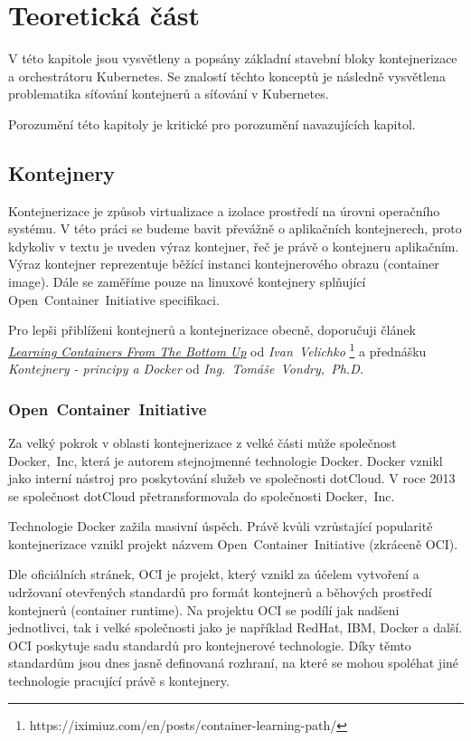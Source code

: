 \chapter{Teoretická část}
\begin{chapterabstract}
V této kapitole jsou vysvětleny a popsány základní stavební bloky kontejnerizace a orchestrátoru Kubernetes. Se znalostí těchto konceptů je následně vysvětlena problematika síťování kontejnerů a síťování v Kubernetes.  

Porozumění této kapitoly je kritické pro porozumění navazujících kapitol.
\end{chapterabstract}

\section{Kontejnery}
Kontejnerizace je způsob virtualizace a izolace prostředí na úrovni operačního systému. V této práci se budeme bavit převážně o aplikačních kontejnerech, proto kdykoliv v textu je uveden výraz kontejner, řeč je právě o kontejneru aplikačním. Výraz kontejner reprezentuje běžící instanci kontejnerového obrazu (container image). Dále se zaměříme pouze na linuxové kontejnery splňující Open~Container~Initiative specifikaci.

Pro lepši přiblíženi kontejnerů a kontejnerizace obecně, doporučuji článek \href{https://iximiuz.com/en/posts/container-learning-path/}{\textit{Learning Containers From The Bottom Up}}  od \textit{Ivan~Velichko} \footnote{https://iximiuz.com/en/posts/container-learning-path/} a přednášku \textit{Kontejnery - principy a Docker} od \textit{Ing.~Tomáše~Vondry,~Ph.D.}
\subsection{Open~Container~Initiative}
Za velký pokrok v oblasti kontejnerizace z velké části může společnost Docker,~Inc, která je autorem stejnojmenné technologie Docker. Docker vznikl jako interní nástroj pro poskytování služeb ve společnosti dotCloud. V roce 2013 se společnost dotCloud přetransformovala do společnosti Docker,~Inc. \cite{poulton_2020_docker}

Technologie Docker zažila masivní úspěch. Právě kvůli vzrůstající popularitě kontejnerizace vznikl projekt názvem Open~Container~Initiative (zkráceně OCI).

Dle oficiálních stránek, OCI je projekt, který vznikl za účelem vytvoření a udržovaní otevřených standardů pro formát kontejnerů a běhových prostředí kontejnerů (container runtime). Na projektu OCI se podílí jak nadšeni jednotlivci, tak i velké společnosti jako je například RedHat, IBM, Docker a další. OCI poskytuje sadu standardů pro kontejnerové technologie. Díky těmto standardům jsou dnes jasně definovaná rozhraní, na které se mohou spoléhat jiné technologie pracující právě s kontejnery.\cite{thelinuxfoundation_about}

